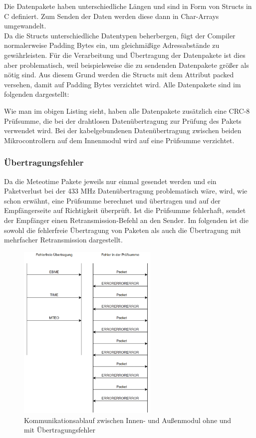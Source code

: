 \documentclass[a4paper,11pt]{article}
\begin{document}
\noindent
Die Datenpakete haben unterschiedliche Längen und sind in Form von Structs in C definiert. Zum Senden der Daten werden diese dann in Char-Arrays umgewandelt. \\
Da die Structs unterschiedliche Datentypen beherbergen, fügt der Compiler normalerweise Padding Bytes ein, um gleichmäßige Adressabstände zu gewährleisten. 
Für die Verarbeitung und Übertragung der Datenpakete ist dies aber problematisch, weil beispielsweise die zu sendenden Datenpakete größer als nötig sind. 
Aus diesem Grund werden die Structs mit dem Attribut packed versehen, damit auf Padding Bytes verzichtet wird. 
Alle Datenpakete sind im folgenden dargestellt:

\newpage


\noindent
Wie man im obigen Listing sieht, haben alle Datenpakete zusätzlich eine CRC-8 Prüfsumme, die bei der drahtlosen Datenübertragung 
zur Prüfung des Pakets verwendet wird. Bei der kabelgebundenen Datenübertragung zwischen beiden Mikrocontrollern
auf dem Innenmodul wird auf eine Prüfsumme verzichtet. 

\subsubsection{Übertragungsfehler}
\label{subsubsub:uebertragungsfehler}

Da die Meteotime Pakete jeweils nur einmal gesendet werden und ein Paketverlust bei der 433 MHz Datenübertragung problematisch wäre, wird, wie schon erwähnt, eine Prüfsumme
berechnet und übertragen und auf der Empfängerseite auf Richtigkeit überprüft. Ist die Prüfsumme fehlerhaft, sendet der Empfänger einen Retransmission-Befehl an den Sender.
Im folgenden ist die sowohl die fehlerfreie Übertragung von Paketen als auch die Übertragung mit mehrfacher Retransmission dargestellt. 

\begin{figure}[H]
  \centering
  \includegraphics[width=0.6\textwidth]{Kommunikation}
  \caption{Kommunikationsablauf zwischen Innen- und Außenmodul ohne und mit Übertragungsfehler}
  \label{fig:kommunikation}
\end{figure}
\end{document}
